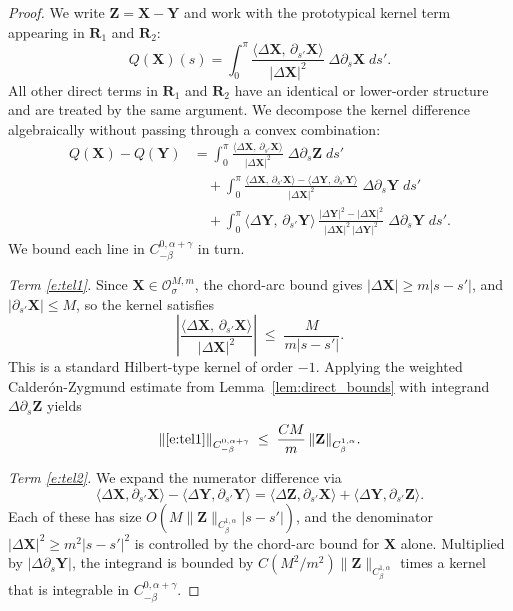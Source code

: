 \documentclass{amsart}
\begin{document}
\begin{proof}
We write $\mathbf{Z} = \mathbf{X} - \mathbf{Y}$ and work with the prototypical kernel
term appearing in $\mathbf{R}_1$ and $\mathbf{R}_2$:
\[
  Q(\mathbf{X})(s)
  = \int_0^\pi
  \frac{\langle \Delta\mathbf{X},\, \partial_{s'}\mathbf{X} \rangle}{|\Delta\mathbf{X}|^2}
  \;\Delta\partial_s\mathbf{X}\;ds'.
\]
All other direct terms in $\mathbf{R}_1$ and $\mathbf{R}_2$ have an identical or lower-order
structure and are treated by the same argument.  We decompose the kernel difference
algebraically without passing through a convex combination:
\begin{align}
  Q(\mathbf{X}) - Q(\mathbf{Y})
  &= \int_0^\pi
  \frac{\langle \Delta\mathbf{X},\, \partial_{s'}\mathbf{X} \rangle}{|\Delta\mathbf{X}|^2}
  \;\Delta\partial_s\mathbf{Z}\;ds' \label{e:tel1} \\
  &\quad + \int_0^\pi
  \frac{\langle \Delta\mathbf{X},\, \partial_{s'}\mathbf{X} \rangle
        - \langle \Delta\mathbf{Y},\, \partial_{s'}\mathbf{Y} \rangle}{|\Delta\mathbf{X}|^2}
  \;\Delta\partial_s\mathbf{Y}\;ds' \label{e:tel2} \\
  &\quad + \int_0^\pi
  \langle \Delta\mathbf{Y},\, \partial_{s'}\mathbf{Y} \rangle
  \,\frac{|\Delta\mathbf{Y}|^2 - |\Delta\mathbf{X}|^2}{|\Delta\mathbf{X}|^2\,|\Delta\mathbf{Y}|^2}
  \;\Delta\partial_s\mathbf{Y}\;ds'. \label{e:tel3}
\end{align}
We bound each line in $C^{0,\alpha+\gamma}_{-\beta}$ in turn.

\medskip
\noindent\textit{Term \eqref{e:tel1}.}
Since $\mathbf{X} \in \mathcal{O}^{M,m}_\sigma$, the chord-arc bound gives
$|\Delta\mathbf{X}| \geq m|s - s'|$, and $|\partial_{s'}\mathbf{X}| \leq M$,
so the kernel satisfies
\[
  \left|\frac{\langle \Delta\mathbf{X},\, \partial_{s'}\mathbf{X} \rangle}{|\Delta\mathbf{X}|^2}\right|
  \;\leq\; \frac{M}{m|s-s'|}.
\]
This is a standard Hilbert-type kernel of order $-1$.  Applying the
weighted Calderón-Zygmund estimate from Lemma~\ref{lem:direct_bounds} with
integrand $\Delta\partial_s\mathbf{Z}$ yields
\[
  \|\text{\eqref{e:tel1}}\|_{C^{0,\alpha+\gamma}_{-\beta}}
  \;\leq\; \frac{CM}{m}\,\|\mathbf{Z}\|_{C^{1,\alpha}_\beta}.
\]

\noindent\textit{Term \eqref{e:tel2}.}
We expand the numerator difference via
\[
  \langle \Delta\mathbf{X}, \partial_{s'}\mathbf{X}\rangle
  - \langle \Delta\mathbf{Y}, \partial_{s'}\mathbf{Y}\rangle
  = \langle \Delta\mathbf{Z}, \partial_{s'}\mathbf{X}\rangle
  + \langle \Delta\mathbf{Y}, \partial_{s'}\mathbf{Z}\rangle.
\]
Each of these has size $O(M\|\mathbf{Z}\|_{C^{1,\alpha}_\beta}|s-s'|)$, and the
denominator $|\Delta\mathbf{X}|^2 \geq m^2|s-s'|^2$ is controlled by the chord-arc
bound for $\mathbf{X}$ alone.  Multiplied by $|\Delta\partial_s\mathbf{Y}|$,
the integrand is bounded by $C(M^2/m^2)\|\mathbf{Z}\|_{C^{1,\alpha}_\beta}$
times a kernel that is integrable in $C^{0,\alpha+\gamma}_{-\beta}$.


\end{proof}
\end{document}
